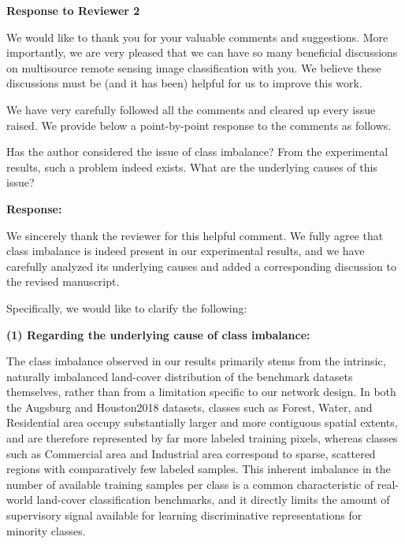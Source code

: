 \label{re:review_2}

\begin{center}
  \large\bf Response to Reviewer 2
\end{center}

We would like to thank you for your valuable comments and suggestions. More importantly, we are very pleased that we can have so many beneficial discussions on multisource remote sensing image classification with you. We believe these discussions must be (and it has been) helpful for us to improve this work.

We have very carefully followed all the comments and cleared up every issue raised. We provide below a point-by-point response to the comments as follows.

\begin{tcolorbox}[title={Reviewer \#2, Comment \#1}]
  \vspace{1em}

  \color{blue}
  Has the author considered the issue of class imbalance? From the experimental results, such a problem indeed exists. What are the underlying causes of this issue?

  \vspace{1em}
\end{tcolorbox}

\textbf{Response:}

We sincerely thank the reviewer for this helpful comment. We fully agree that class imbalance is indeed present in our experimental results, and we have carefully analyzed its underlying causes and added a corresponding discussion to the revised manuscript.

Specifically, we would like to clarify the following:

\textbf{(1) Regarding the underlying cause of class imbalance:}

The class imbalance observed in our results primarily stems from the intrinsic, naturally imbalanced land-cover distribution of the benchmark datasets themselves, rather than from a limitation specific to our network design. In both the Augsburg and Houston2018 datasets, classes such as Forest, Water, and Residential area occupy substantially larger and more contiguous spatial extents, and are therefore represented by far more labeled training pixels, whereas classes such as Commercial area and Industrial area correspond to sparse, scattered regions with comparatively few labeled samples. This inherent imbalance in the number of available training samples per class is a common characteristic of real-world land-cover classification benchmarks, and it directly limits the amount of supervisory signal available for learning discriminative representations for minority classes.

